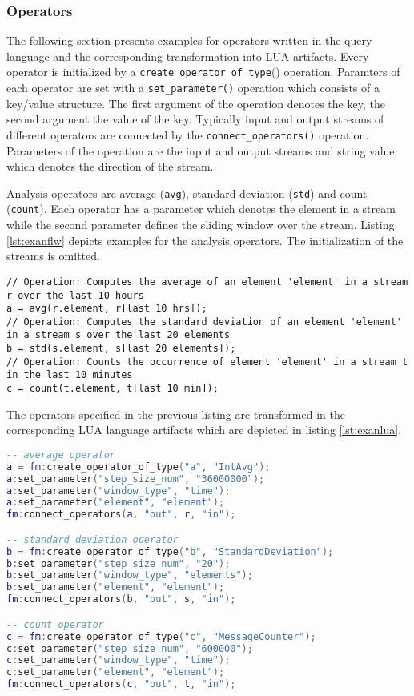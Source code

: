 \subsubsection{Operators}
The following section presents examples for operators written in the query 
language and the corresponding  transformation into LUA artifacts. Every 
operator is initialized by a \texttt{create\_operator\_of\_type}() operation. 
Paramters of each operator are set with a \texttt{set\_param\-eter()} operation 
which consists of a key/value structure. The first argument of the operation
denotes the key, the second argument the value of the key. Typically input and
output streams of different operators are connected by the 
\texttt{connect\_operators()} operation. Parameters of the operation are the 
input and output streams and string value which denotes the direction of the 
stream. 

Analysis operators are average (\texttt{avg}), standard deviation (\texttt{std})
and count (\texttt{count}). Each operator has a parameter which denotes the 
element in a stream while the second parameter defines the sliding window over
the stream. Listing \ref{lst:exanflw} depicts examples for the analysis 
operators. The initialization of the streams is omitted. 
\begin{lstlisting}[language=Flow, caption={\emph{Examples of Analysis Operators in Flow}},label={lst:exanflw}]
// Operation: Computes the average of an element 'element' in a stream r over the last 10 hours
a = avg(r.element, r[last 10 hrs]);
// Operation: Computes the standard deviation of an element 'element' in a stream s over the last 20 elements
b = std(s.element, s[last 20 elements]);
// Operation: Counts the occurrence of element 'element' in a stream t in the last 10 minutes
c = count(t.element, t[last 10 min]);
\end{lstlisting}
The operators specified in the previous listing are transformed in the 
corresponding LUA language artifacts which are depicted in listing 
\ref{lst:exanlua}. 
\begin{lstlisting}[language=Lua, caption={\emph{Examples of Analysis Operators in LUA}},label={lst:exanlua}]
-- average operator
a = fm:create_operator_of_type("a", "IntAvg");
a:set_parameter("step_size_num", "36000000");
a:set_parameter("window_type", "time");
a:set_parameter("element", "element");
fm:connect_operators(a, "out", r, "in");

-- standard deviation operator
b = fm:create_operator_of_type("b", "StandardDeviation");
b:set_parameter("step_size_num", "20");
b:set_parameter("window_type", "elements");
b:set_parameter("element", "element");
fm:connect_operators(b, "out", s, "in");

-- count operator
c = fm:create_operator_of_type("c", "MessageCounter");
c:set_parameter("step_size_num", "600000");
c:set_parameter("window_type", "time");
c:set_parameter("element", "element");
fm:connect_operators(c, "out", t, "in");
\end{lstlisting}


